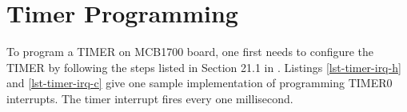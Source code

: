 \section{Timer Programming}
To program a TIMER on MCB1700 board, one first needs to configure the TIMER by following the steps listed in Section 21.1 in \cite{nxp.lpc17xx.manual}. Listings \ref{lst-timer-irq-h} and \ref{lst-timer-irq-c} give one sample implementation of programming TIMER0 interrupts. The timer interrupt fires every one millisecond. 
\\





